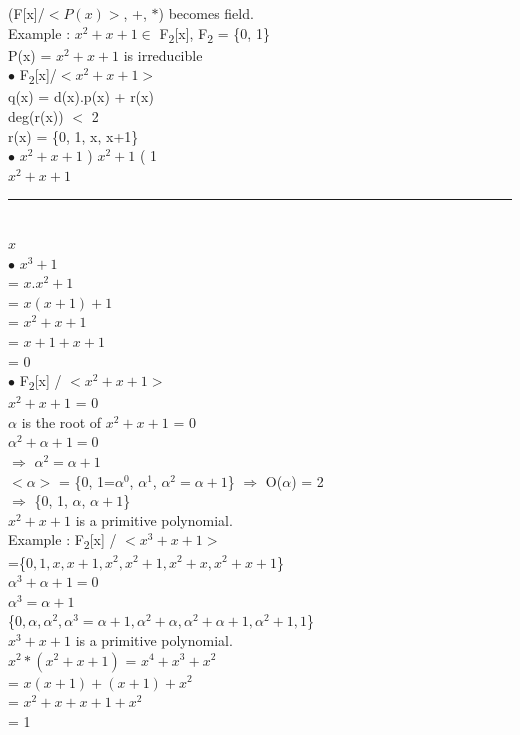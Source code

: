 \documentclass[11pt]{article}
\newcommand*{\xdash}[1][3em]{\rule[0.5ex]{#1}{0.55pt}}
\begin{document}
	(F[x]/$<P(x)>$, +, $\ast$) becomes field.\\
	Example : $x^2 + x + 1 \in $ F\textsubscript{2}[x], F\textsubscript{2} = \{0, 1\}\\
	P(x) = $x^2 + x + 1$ is irreducible \vspace{0.3cm}\\
	$\bullet$ F\textsubscript{2}[x]/$<x^2 + x + 1>$\\
	q(x) = d(x).p(x) + r(x)\\
	deg(r(x)) $<$ 2\\
	r(x) = \{0, 1, x, x+1\}\vspace{0.3cm}\\
	$\bullet$ $x^2 + x + 1$ ) $x^2 + 1$ ( 1\\
	\hspace*{2cm} $x^2 + x + 1$\\
	\hspace*{2cm} \xdash[5em]\\
	\hspace*{2.7cm} $x$\vspace{0.3cm}\\
	$\bullet$ $x^3 + 1$\\
	= $x.x^2 + 1$\\
	= $x(x + 1) + 1$\\
	= $x^2 + x + 1$\\
	= $x + 1 + x + 1$\\
	= 0\vspace{0.3cm}\\
	$\bullet$ F\textsubscript{2}[x] / $<x^2 + x + 1>$\\
	$x^2 + x + 1$ = 0\\
	$\alpha$ is the root of $x^2 + x + 1$ = 0\\
	$\alpha^2 + \alpha + 1 = 0$\\
	$\Rightarrow$ $\alpha^2 = \alpha + 1$\\
	$<\alpha>$ = \{0, 1=$\alpha^0$, $\alpha^1$, $\alpha^2 = \alpha + 1$\} $\Rightarrow$ O($\alpha$) = 2\\
	$\Rightarrow$ \{0, 1, $\alpha$, $\alpha + 1$\}\\
	$x^2 + x + 1$ is a primitive polynomial.\vspace{0.3cm}\\
	Example : F\textsubscript{2}[x] / $<x^3 + x + 1>$\\
	=\{$0, 1, x, x + 1, x^2, x^2+1, x^2+x, x^2+x+1$\}\\
	$\alpha^3 + \alpha + 1 = 0$\\
	$\alpha^3 = \alpha + 1$\\
	\{$0, \alpha, \alpha^2, \alpha^3 = \alpha+1, \alpha^2+\alpha, \alpha^2+\alpha+1, \alpha^2+1, 1$\}\\
	$x^3 + x + 1$ is a primitive polynomial.\\
	$x^2 * (x^2 + x + 1)$ = $x^4 + x^3 + x^2$\\
	= $x(x+1) + (x+1) + x^2$\\
	= $x^2 + x + x + 1 + x^2$\\
	= 1
	
\end{document}
